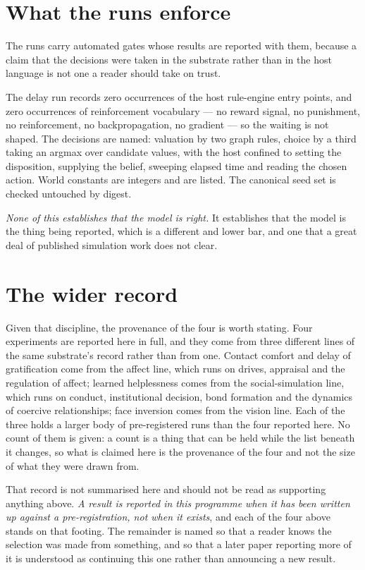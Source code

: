 \documentclass[11pt,a4paper]{article}
\theoremstyle{remark}
\begin{document}
\section{What the runs enforce}\label{sec:discipline}
The runs carry automated gates whose results are reported with them, because a claim that
the decisions were taken in the substrate rather than in the host language is not one a reader
should take on trust.

The delay run records zero occurrences of the host rule-engine entry points, and zero occurrences of
reinforcement vocabulary --- no reward signal, no punishment, no reinforcement, no backpropagation,
no gradient --- so the waiting is not shaped. The decisions are named: valuation by two graph rules,
choice by a third taking an argmax over candidate values, with the host confined to setting the
disposition, supplying the belief, sweeping elapsed time and reading the chosen action. World
constants are integers and are listed. The canonical seed set is checked untouched by digest.

\emph{None of this establishes that the model is right.} It establishes that the model is the thing
being reported, which is a different and lower bar, and one that a great deal of published
simulation work does not clear.

\section{The wider record}\label{sec:record}
Given that discipline, the provenance of the four is worth stating. Four experiments are reported
here in full, and they come from three different lines of the same
substrate's record rather than from one. Contact comfort and delay of gratification come from the
affect line, which runs on drives, appraisal and the regulation of affect; learned helplessness
comes from the social-simulation line, which runs on conduct, institutional decision, bond
formation and the dynamics of coercive relationships; face inversion comes from the vision line.
Each of the three holds a larger body of pre-registered runs than the four reported here. No count
of them is given: a count is a thing that can be held while the list beneath it changes, so what is
claimed here is the provenance of the four and not the size of what they were drawn from.

That record is not summarised here and should not be read as supporting anything above. \emph{A
result is reported in this programme when it has been written up against a pre-registration, not
when it exists}, and each of the four above stands on that footing. The remainder is named so that
a reader knows the selection was made from something, and so that a later paper reporting more of
it is understood as continuing this one rather than announcing a new result.
\end{document}
